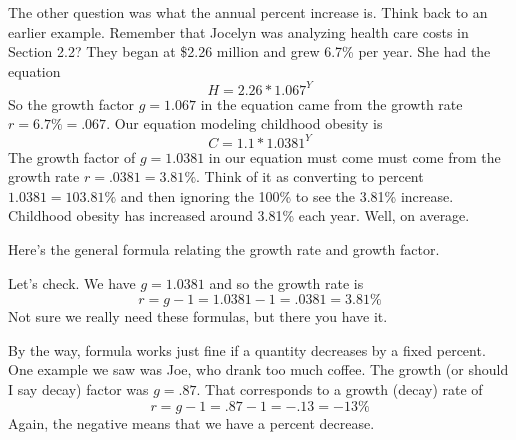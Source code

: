 The other question was what the annual percent increase is.  Think back to an earlier example.  Remember that Jocelyn was analyzing health care costs in Section 2.2?  
They began at \$2.26 million and grew 6.7\% per year.  She had the equation 
$$H=2.26\ast1.067^Y$$
So the growth factor $g=1.067$ in the equation came from the growth rate $r=6.7\%=.067$.
Our equation modeling childhood obesity is $$C = 1.1 \ast 1.0381^Y$$ 
The growth factor of $g=1.0381$ in our equation must come must come from the growth rate $r= .0381=3.81\%$. Think of it as converting to percent $1.0381 = 103.81 \%$ and then ignoring the 100\% to see the 3.81\% increase.
Childhood obesity has increased around 3.81\% each year.  Well, on average.
 
Here's the general formula relating the growth rate and growth factor.

 \bigskip
\bigskip

\noindent Let's check.  We have $g=1.0381$ and so the growth rate is 
$$r=g-1 = 1.0381-1 = .0381= 3.81\%$$
Not sure we really need these formulas, but there you have it.

By the way, formula works just fine if a quantity decreases by a fixed percent. One example we saw was Joe, who drank too much coffee.  The growth (or should I say decay) factor was $g=.87$.  That corresponds to a growth (decay) rate of 
$$r=g-1=.87-1=-.13=-13\%$$
Again, the negative means that we have a percent decrease.

